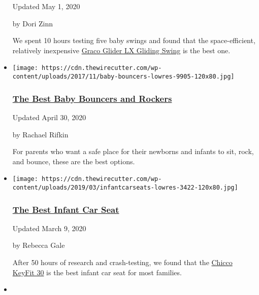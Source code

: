 \begin{itemize}
  Updated May 1, 2020

  by Dori Zinn

  We spent 10 hours testing five baby swings and found that the
  space-efficient, relatively inexpensive
  \href{https://www.nytimes3xbfgragh.onion/wirecutter/out/link/23874/161464/4/68928/?merchant=BuyBuy\%20Baby}{Graco
  Glider LX Gliding Swing} is the best one.
\item
  \href{https://www.nytimes3xbfgragh.onion/wirecutter/reviews/best-baby-bouncers-and-rockers/}{}

  \texttt{[image: https://cdn.thewirecutter.com/wp-content/uploads/2017/11/baby-bouncers-lowres-9905-120x80.jpg]}

  \hypertarget{the-best-baby-bouncers-and-rockers}{%
  \subsubsection{\texorpdfstring{\href{https://www.nytimes3xbfgragh.onion/wirecutter/reviews/best-baby-bouncers-and-rockers/}{The
  Best Baby Bouncers and
  Rockers}}{The Best Baby Bouncers and Rockers}}\label{the-best-baby-bouncers-and-rockers}}

  Updated April 30, 2020

  by Rachael Rifkin

  For parents who want a safe place for their newborns and infants to
  sit, rock, and bounce, these are the best options.
\item
  \href{https://www.nytimes3xbfgragh.onion/wirecutter/reviews/best-infant-car-seat/}{}

  \texttt{[image: https://cdn.thewirecutter.com/wp-content/uploads/2019/03/infantcarseats-lowres-3422-120x80.jpg]}

  \hypertarget{the-best-infant-car-seat}{%
  \subsubsection{\texorpdfstring{\href{https://www.nytimes3xbfgragh.onion/wirecutter/reviews/best-infant-car-seat/}{The
  Best Infant Car
  Seat}}{The Best Infant Car Seat}}\label{the-best-infant-car-seat}}

  Updated March 9, 2020

  by Rebecca Gale

  After 50 hours of research and crash-testing, we found that the
  \href{https://www.nytimes3xbfgragh.onion/wirecutter/out/link/20695/110248/4/49748/?merchant=Amazon}{Chicco
  KeyFit 30} is the best infant car seat for most families.
\item
  \href{https://www.nytimes3xbfgragh.onion/wirecutter/reviews/best-co-sleepers/}{}


\end{itemize}
